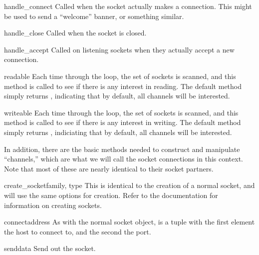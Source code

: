 \begin{methoddesc}{handle_connect}{}
  Called when the socket actually makes a connection.  This 
  might be used to send a ``welcome'' banner, or something 
  similar.
\end{methoddesc}

\begin{methoddesc}{handle_close}{}
  Called when the socket is closed.
\end{methoddesc}

\begin{methoddesc}{handle_accept}{}
  Called on listening sockets when they actually accept a new 
  connection.
\end{methoddesc}

\begin{methoddesc}{readable}{}
  Each time through the  loop, the set of sockets 
  is scanned, and this method is called to see if there is any 
  interest in reading.  The default method simply returns , 
  indicating that by default, all channels will be interested.
\end{methoddesc}

\begin{methoddesc}{writeable}{}
  Each time through the  loop, the set of sockets 
  is scanned, and this method is called to see if there is any 
  interest in writing.  The default method simply returns , 
  indiciating that by default, all channels will be interested.
\end{methoddesc}

In addition, there are the basic methods needed to construct and
manipulate ``channels,'' which are what we will call the socket
connections in this context. Note that most of these are nearly 
identical to their socket partners.

\begin{methoddesc}{create_socket}{family, type}
  This is identical to the creation of a normal socket, and 
  will use the same options for creation.  Refer to the
   documentation for information on creating
  sockets.
\end{methoddesc}

\begin{methoddesc}{connect}{address}
  As with the normal socket object,  is a 
  tuple with the first element the host to connect to, and the 
  second the port.
\end{methoddesc}

\begin{methoddesc}{send}{data}
  Send  out the socket.
\end{methoddesc}

